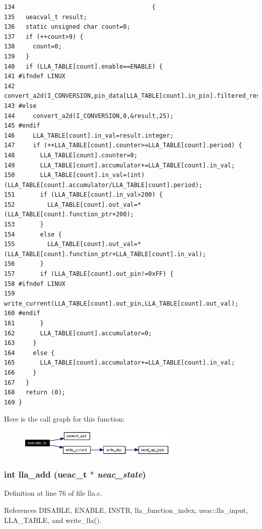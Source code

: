 \footnotesize\begin{verbatim}134                                      {
135   ueacval_t result;
136   static unsigned char count=0;
137   if (++count>9) {
138     count=0;
139   }
140   if (LLA_TABLE[count].enable==ENABLE) {
141 #ifndef LINUX
142     convert_a2d(I_CONVERSION,pin_data[LLA_TABLE[count].in_pin].filtered_result,&result,LLA_TABLE[count].in_pin);
143 #else 
144     convert_a2d(I_CONVERSION,0,&result,25);
145 #endif
146     LLA_TABLE[count].in_val=result.integer;      
147     if (++LLA_TABLE[count].counter>=LLA_TABLE[count].period) {
148       LLA_TABLE[count].counter=0;
149       LLA_TABLE[count].accumulator+=LLA_TABLE[count].in_val;
150       LLA_TABLE[count].in_val=(int)(LLA_TABLE[count].accumulator/LLA_TABLE[count].period);
151       if (LLA_TABLE[count].in_val>200) {
152         LLA_TABLE[count].out_val=*(LLA_TABLE[count].function_ptr+200);
153       }
154       else {
155         LLA_TABLE[count].out_val=*(LLA_TABLE[count].function_ptr+LLA_TABLE[count].in_val);
156       }
157       if (LLA_TABLE[count].out_pin!=0xFF) {
158 #ifndef LINUX
159         write_current(LLA_TABLE[count].out_pin,LLA_TABLE[count].out_val);
160 #endif
161       }
162       LLA_TABLE[count].accumulator=0;
163     }
164     else {
165       LLA_TABLE[count].accumulator+=LLA_TABLE[count].in_val;
166     }
167   }
168   return (0);
169 }
\end{verbatim}\normalsize 




Here is the call graph for this function:\begin{figure}[H]
\begin{center}
\leavevmode
\includegraphics[width=216pt]{lla_8c_a9_cgraph}
\end{center}
\end{figure}
\subsubsection{\setlength{\rightskip}{0pt plus 5cm}int lla\_\-add ({\bf ueac\_\-t} $\ast$ {\em ueac\_\-state})}\label{lla_8c_a6}




Definition at line 76 of file lla.c.

References DISABLE, ENABLE, INSTR, lla\_\-function\_\-index, ueac::lla\_\-input, LLA\_\-TABLE, and write\_\-lla().

